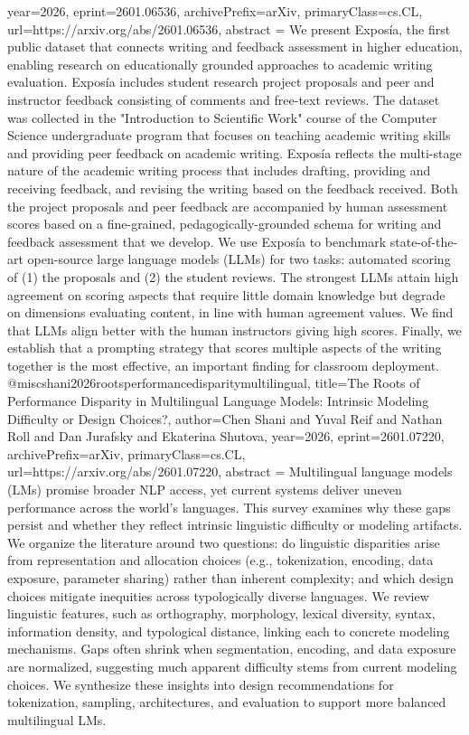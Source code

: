 {      year={2026},
      eprint={2601.06536},
      archivePrefix={arXiv},
      primaryClass={cs.CL},
      url={https://arxiv.org/abs/2601.06536},
      abstract = {We present Exposía, the first public dataset that connects writing and feedback assessment in higher education, enabling research on educationally grounded approaches to academic writing evaluation. Exposía includes student research project proposals and peer and instructor feedback consisting of comments and free-text reviews. The dataset was collected in the "Introduction to Scientific Work" course of the Computer Science undergraduate program that focuses on teaching academic writing skills and providing peer feedback on academic writing. Exposía reflects the multi-stage nature of the academic writing process that includes drafting, providing and receiving feedback, and revising the writing based on the feedback received. Both the project proposals and peer feedback are accompanied by human assessment scores based on a fine-grained, pedagogically-grounded schema for writing and feedback assessment that we develop.   We use Exposía to benchmark state-of-the-art open-source large language models (LLMs) for two tasks: automated scoring of (1) the proposals and (2) the student reviews. The strongest LLMs attain high agreement on scoring aspects that require little domain knowledge but degrade on dimensions evaluating content, in line with human agreement values. We find that LLMs align better with the human instructors giving high scores. Finally, we establish that a prompting strategy that scores multiple aspects of the writing together is the most effective, an important finding for classroom deployment.}
}@misc{shani2026rootsperformancedisparitymultilingual,
      title={The Roots of Performance Disparity in Multilingual Language Models: Intrinsic Modeling Difficulty or Design Choices?}, 
      author={Chen Shani and Yuval Reif and Nathan Roll and Dan Jurafsky and Ekaterina Shutova},
      year={2026},
      eprint={2601.07220},
      archivePrefix={arXiv},
      primaryClass={cs.CL},
      url={https://arxiv.org/abs/2601.07220},
      abstract = {Multilingual language models (LMs) promise broader NLP access, yet current systems deliver uneven performance across the world's languages. This survey examines why these gaps persist and whether they reflect intrinsic linguistic difficulty or modeling artifacts. We organize the literature around two questions: do linguistic disparities arise from representation and allocation choices (e.g., tokenization, encoding, data exposure, parameter sharing) rather than inherent complexity; and which design choices mitigate inequities across typologically diverse languages. We review linguistic features, such as orthography, morphology, lexical diversity, syntax, information density, and typological distance, linking each to concrete modeling mechanisms. Gaps often shrink when segmentation, encoding, and data exposure are normalized, suggesting much apparent difficulty stems from current modeling choices. We synthesize these insights into design recommendations for tokenization, sampling, architectures, and evaluation to support more balanced multilingual LMs.}
}
